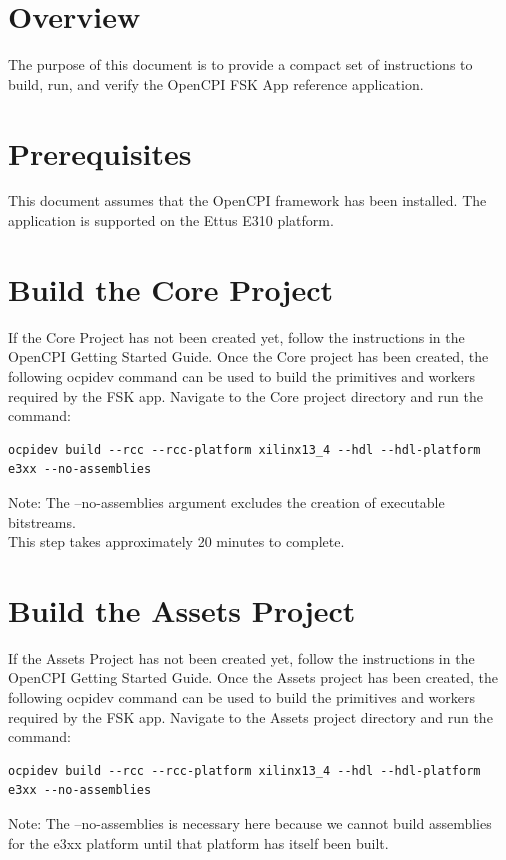 \newpage
\begin{flushleft}
\section{Overview}
The purpose of this document is to provide a compact set of instructions to build, run, and verify the OpenCPI FSK App reference application.

\section{Prerequisites}
This document assumes that the OpenCPI framework has been installed. The application is supported on the Ettus E310 platform.

\section{Build the Core Project}
If the Core Project has not been created yet, follow the instructions in the OpenCPI Getting Started Guide. Once the Core project has been created, the following ocpidev command can be used to build the primitives and workers required by the FSK app. Navigate to the Core project directory and run the command:
\begin{verbatim}
ocpidev build --rcc --rcc-platform xilinx13_4 --hdl --hdl-platform e3xx --no-assemblies
\end{verbatim}

Note: The --no-assemblies argument excludes the creation of executable bitstreams.\\
This step takes approximately 20 minutes to complete.\\

\section{Build the Assets Project}
If the Assets Project has not been created yet, follow the instructions in the OpenCPI Getting Started Guide. Once the Assets project has been created, the following ocpidev command can be used to build the primitives and workers required by the FSK app. Navigate to the Assets project directory and run the command:
\begin{verbatim}
ocpidev build --rcc --rcc-platform xilinx13_4 --hdl --hdl-platform e3xx --no-assemblies
\end{verbatim}
Note: The --no-assemblies is necessary here because we cannot build assemblies for the e3xx platform until that platform has itself been built.\\


\end{flushleft}
